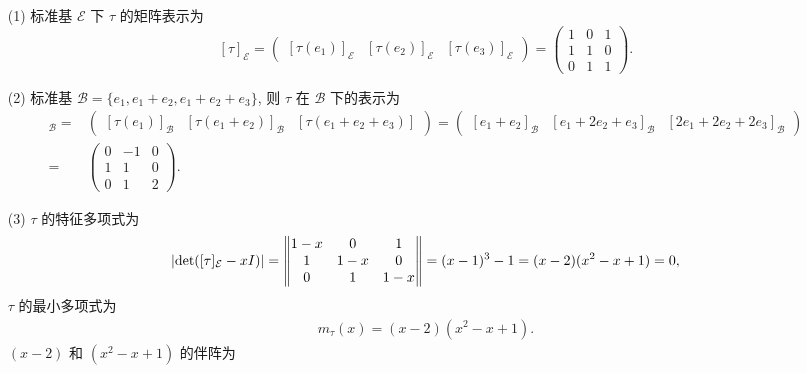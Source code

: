 \documentclass{assignment}
\begin{document}
\begin{sol}
    \begin{itemize}
        \item[(1)] 标准基 $\mathcal{E}$ 下 $\tau$ 的矩阵表示为
        \[
            [\tau]_{\mathcal{E}}=\begin{pmatrix}
                [\tau(e_1)]_{\mathcal{E}}&[\tau(e_2)]_{\mathcal{E}}&[\tau(e_3)]_{\mathcal{E}}
            \end{pmatrix}=\begin{pmatrix}
                1&0&1\\
                1&1&0\\
                0&1&1
            \end{pmatrix}.
        \]
        \item[(2)] 标准基 $\mathcal{B}=\{e_1,e_1+e_2,e_1+e_2+e_3\}$, 则 $\tau$ 在 $\mathcal{B}$ 下的表示为
        \begin{align*}
            [\tau]_{\mathcal{B}}=&\begin{pmatrix}
                [\tau(e_1)]_{\mathcal{B}}&[\tau(e_1+e_2)]_{\mathcal{B}}&[\tau(e_1+e_2+e_3)]
            \end{pmatrix}=\begin{pmatrix}
                [e_1+e_2]_{\mathcal{B}}&[e_1+2e_2+e_3]_{\mathcal{B}}&[2e_1+2e_2+2e_3]_{\mathcal{B}}
            \end{pmatrix}\\
            =&\begin{pmatrix}
                0&-1&0\\
                1&1&0\\
                0&1&2
            \end{pmatrix}.
        \end{align*}
        \item[(3)] $\tau$ 的特征多项式为
        \begin{align}
            \left\lvert\det([\tau]_{\mathcal{E}}-xI)\right\rvert=\begin{Vmatrix}
                1-x&0&1\\
                1&1-x&0\\
                0&1&1-x
            \end{Vmatrix}=(x-1)^3-1=(x-2)(x^2-x+1)=0,
        \end{align}
        $\tau$ 的最小多项式为
        \begin{align}
            m_{\tau}(x)=(x-2)(x^2-x+1).
        \end{align}
        $(x-2)$ 和 $(x^2-x+1)$ 的伴阵为

\end{itemize}
\end{sol}
\end{document}
